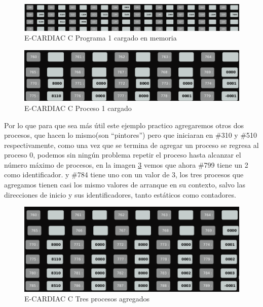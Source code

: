 \documentclass[letterpaper,12pt,oneside]{book}
\begin{document}
		\begin{figure}[h]		
			\centering
			\includegraphics[scale=0.25]{media/CARDIACC/eccPrograma1Cargado.png}
			\caption{E-CARDIAC C Programa 1 cargado en memoria}
			\label{fig:eccPrograma1Cargado}
		\end{figure}					
		

		\begin{figure}[h]		
			\centering
			\includegraphics[scale=0.45]{media/CARDIACC/eccZonaProcesosPrograma1.png}
			\caption{E-CARDIAC C Proceso 1 cargado}
			\label{fig:eccZPProceso1}
		\end{figure}	
		

		Por lo que para que sea más útil este ejemplo practico agregaremos otros dos procesos, que hacen lo mismo(son ``pintores'') pero que iniciaran en \#310 y \#510 
		respectivamente, como una vez que se termina de agregar un proceso se regresa al proceso 0, podemos sin ningún problema repetir el proceso
		hasta alcanzar el número máximo de procesos, en la imagen \ref{fig:eccTresProcessoAgregados} vemos que ahora \#799 tiene un 2 como identificador. y \#784 tiene
		uno con un valor de 3, los tres procesos que agregamos tienen casi los mismo valores de arranque en su contexto, salvo las direcciones de inicio
		y sus identificadores, tanto estáticos como contadores.
		
		
		\begin{figure}[h]		
			\centering
			\includegraphics[scale=0.45]{media/CARDIACC/eccZP3procesosadded.png}
			\caption{E-CARDIAC C Tres procesos agregados }
			\label{fig:eccTresProcessoAgregados}
		\end{figure}					
		
\end{document}
